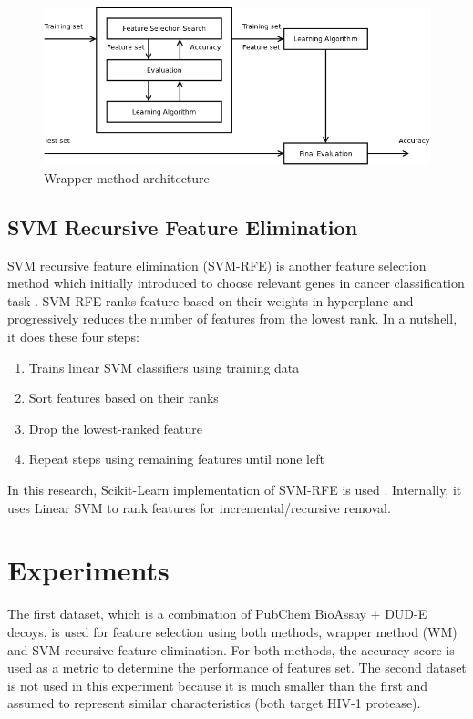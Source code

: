 \documentclass[conference]{IEEEtran}
\begin{document}
\begin{figure}
	\centering	
	\includegraphics[scale=0.25]{../images/wrapper_method.png}
	\caption{Wrapper method architecture \cite{tang2014feature}}
	\label{fig_wrapper_method_architecture}
\end{figure}

\subsection{SVM Recursive Feature Elimination}

SVM recursive feature elimination (SVM-RFE) is another feature selection method which initially introduced to choose relevant genes in cancer classification task \cite{guyon2002gene}. SVM-RFE ranks feature based on their weights in hyperplane and progressively reduces the number of features from the lowest rank. In a nutshell, it does these four steps:

\begin{enumerate}
	\item Trains linear SVM classifiers using training data
	\item Sort features based on their ranks
	\item Drop the lowest-ranked feature
	\item Repeat steps using remaining features until none left
\end{enumerate}

In this research, Scikit-Learn implementation of SVM-RFE is used \cite{pedregosa2011scikit}. Internally, it uses Linear SVM to rank features for incremental/recursive removal.

\section{Experiments} \label{Experiments}

The first dataset, which is a combination of PubChem BioAssay + DUD-E decoys, is used for feature selection using both methods, wrapper method (WM) and SVM recursive feature elimination. For both methods, the accuracy score is used as a metric to determine the performance of features set. The second dataset is not used in this experiment because it is much smaller than the first and assumed to represent similar characteristics (both target HIV-1 protease).
\end{document}
